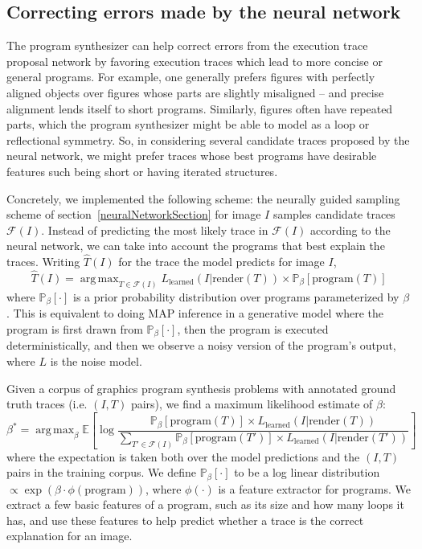 \documentclass{article}
\DeclareMathOperator*{\argmax}{arg\,max} %
\newcommand{\expect}{\mathds{E}} %
\newcommand{\probability}{\mathds{P}} %
\begin{document}
\subsection{Correcting errors made by the neural network}\label{synthesizerHelpsParsing}
The program synthesizer can help correct errors from the execution trace proposal network by favoring execution traces which lead to more concise or general programs.
For example, one generally prefers figures with perfectly aligned objects over figures whose parts are slightly misaligned -- and precise alignment lends itself to short programs.
Similarly, figures often have repeated parts,
which the program synthesizer might be able to model as a loop or reflectional symmetry.
So, in considering several candidate traces proposed by the neural network,
we might prefer traces whose best programs have desirable features such being short or having iterated structures.

Concretely, we implemented the following scheme: the neurally guided sampling scheme of section~\ref{neuralNetworkSection} for image $I$ samples candidate traces $\mathcal{F}(I)$.
Instead of predicting the most likely trace in $\mathcal{F}(I)$ according to the neural network,
we can take into account the programs that best explain the traces. 
Writing $\hat{T}(I)$ for the trace the model predicts for image $I$,
\begin{equation}
\hat{T}(I) = \argmax_{T\in \mathcal{F}(I)} L_{\text{learned}}(I | \text{render}(T)) \times\probability_{\beta} [ \text{program}(T)] 
\end{equation}
where $\probability_{\beta} [\cdot]$ is a prior probability
distribution over programs parameterized by $\beta$.
This is equivalent to doing
MAP inference in a generative model where the program is first drawn
from $\probability_{\beta} [\cdot]$, then the program is executed deterministically,
and then we observe a noisy version of the program's output, where $L$
is the noise model.

Given a corpus of graphics program synthesis problems with annotated ground truth traces (i.e. $(I,T)$ pairs),
we find a maximum likelihood estimate of $\beta$:
\begin{equation}
  \beta^* = \argmax_{\beta} \expect \left[ \log \frac{\probability_{\beta} [\text{program}(T)]\times L_{\text{learned}}(I|\text{render}(T))}{\sum_{T'\in \mathcal{F}(I)} \probability_{\beta} [\text{program}(T')]\times L_{\text{learned}}(I|\text{render}(T'))} \right]
\end{equation}
where the expectation is taken both over the model predictions and the
$(I,T)$ pairs in the training corpus.  We define $\probability_{\beta}
[\cdot]$ to be a log linear distribution $\propto \exp
(\beta\cdot \phi(\text{program}))$, where $\phi(\cdot)$ is a feature
extractor for programs.  We extract a few basic features of a
program, such as its size and how many loops it has, and use these
features to help predict whether a trace is the correct explanation
for an image.
\end{document}
